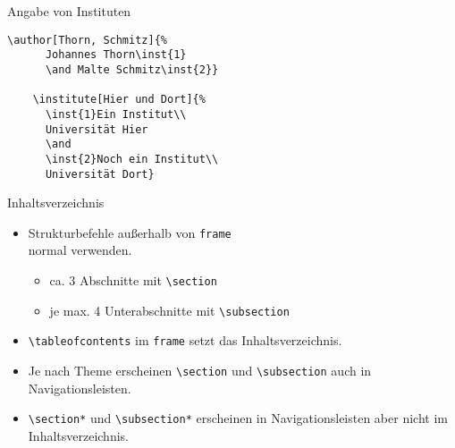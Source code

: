 \begin{Frame}[fragile]{Angabe von Instituten}
  \begin{lstlisting}[gobble=4]
    \author[Thorn, Schmitz]{%
      Johannes Thorn\inst{1}
      \and Malte Schmitz\inst{2}}

    \institute[Hier und Dort]{%
      \inst{1}Ein Institut\\
      Universität Hier
      \and
      \inst{2}Noch ein Institut\\
      Universität Dort}
  \end{lstlisting}
\end{Frame}


\begin{Frame}[fragile]{Inhaltsverzeichnis}
  \begin{itemize}
    \item Strukturbefehle außerhalb von \lstinline-frame-\\
      normal verwenden.
      \begin{itemize}
        \item ca. 3 Abschnitte mit \lstinline-\section-
        \item je max. 4 Unterabschnitte mit \lstinline-\subsection-
      \end{itemize}
    \item \lstinline-\tableofcontents- im \lstinline-frame- setzt das Inhaltsverzeichnis.
    \item Je nach Theme erscheinen \lstinline-\section- und
      \lstinline-\subsection- auch in Navigationsleisten.
    \item \lstinline-\section*- und \lstinline-\subsection*- erscheinen in
      Navigationsleisten aber nicht im Inhaltsverzeichnis.
  \end{itemize}
\end{Frame}

